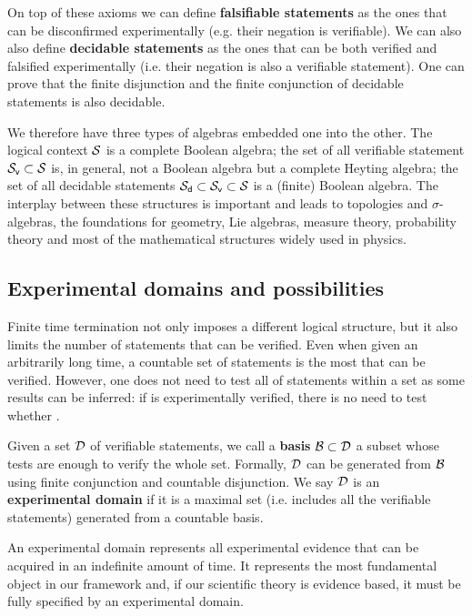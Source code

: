 \documentclass[twocolumn]{article}
\begin{document}
On top of these axioms we can define \textbf{falsifiable statements} as the ones that can be disconfirmed experimentally (e.g. their negation is verifiable). We can also also define \textbf{decidable statements} as the ones that can be both verified and falsified experimentally (i.e. their negation is also a verifiable statement). One can prove that the finite disjunction and the finite conjunction of decidable statements is also decidable.

We therefore have three types of algebras embedded one into the other. The logical context $\mathcal{S}$ is a complete Boolean algebra; the set of all verifiable statement $\mathcal{S}_\textsf{v} \subset \mathcal{S}$ is, in general, not a Boolean algebra but a complete Heyting algebra; the set of all decidable statements $\mathcal{S}_\textsf{d} \subset \mathcal{S}_\textsf{v} \subset \mathcal{S}$ is a (finite) Boolean algebra. The interplay between these structures is important and leads to topologies and $\sigma$-algebras, the foundations for geometry, Lie algebras, measure theory, probability theory and most of the mathematical structures widely used in physics.

\subsection{Experimental domains and possibilities}

Finite time termination not only imposes a different logical structure, but it also limits the number of statements that can be verified. Even when given an arbitrarily long time, a countable set of statements is the most that can be verified. However, one does not need to test all of statements within a set as some results can be inferred: if  is experimentally verified, there is no need to test whether .

Given a set $\mathcal{D}$ of verifiable statements, we call a \textbf{basis} $\mathcal{B} \subset \mathcal{D}$ a subset whose tests are enough to verify the whole set. Formally, $\mathcal{D}$ can be generated from $\mathcal{B}$ using finite conjunction and countable disjunction. We say $\mathcal{D}$ is an \textbf{experimental domain} if it is a maximal set (i.e. includes all the verifiable statements) generated from a countable basis.

An experimental domain represents all experimental evidence that can be acquired in an indefinite amount of time. It represents the most fundamental object in our framework and, if our scientific theory is evidence based, it must be fully specified by an experimental domain.
\end{document}
